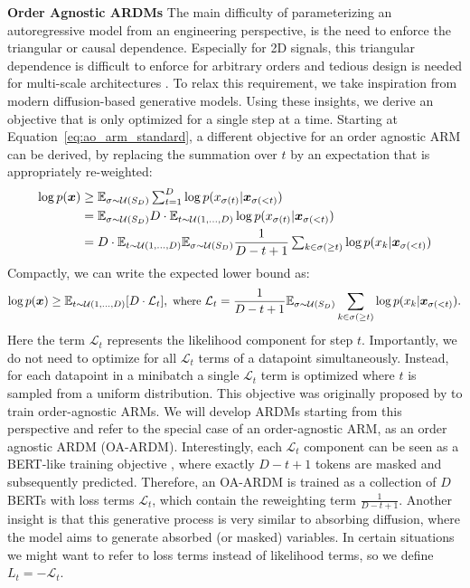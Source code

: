 \documentclass{article} \usepackage{iclr2022_conference,times}
\def\vx{{\bm{x}}}
\begin{document}
\textbf{Order Agnostic ARDMs} \hspace{.2cm} The main difficulty of parameterizing an autoregressive model from an engineering perspective, is the need to enforce the triangular or causal dependence. Especially for 2D signals, this triangular dependence is difficult to enforce for arbitrary orders \citep{jain2020locallymasked} and tedious design is needed for multi-scale architectures \citep{salimans2017pixelcnnpp}. To relax this requirement, we take inspiration from modern diffusion-based generative models. Using these insights, we derive an objective that is only optimized for a single step at a time. Starting at Equation~\ref{eq:ao_arm_standard}, a different objective for an order agnostic ARM can be derived, by replacing the summation over $t$ by an expectation that is appropriately re-weighted:
\begin{align*}
\small
\log p(\vx) &\geq \mathbb{E}_{\sigma \sim \mathcal{U}(S_D)} \textstyle\sum_{t=1}^{D} \log p(x_{\sigma(t)} | \vx_{\sigma(<t)}) \\ 
    &= \mathbb{E}_{\sigma \sim \mathcal{U}(S_D)} D \cdot \mathbb{E}_{t \sim \mathcal{U}(1, \ldots, D)}  \log p(x_{\sigma(t)} | \vx_{\sigma(<t)}) \\
     &= D \cdot \mathbb{E}_{t \sim \mathcal{U}(1, \ldots, D)} \mathbb{E}_{\sigma \sim \mathcal{U}(S_D)} \frac{1}{D - t + 1} \textstyle\sum_{k \in \sigma(\geq t)} \log p(x_{k} | \vx_{\sigma(<t)})
\end{align*}
Compactly, we can write the expected lower bound as:
\begin{equation*}
\small
\log p(\vx) \geq \mathbb{E}_{t \sim \mathcal{U}(1, \ldots, D)}[D \cdot \mathcal{L}_t], \text{ where } \mathcal{L}_t = \frac{1}{D - t + 1} \mathbb{E}_{\sigma \sim \mathcal{U}(S_D)} \sum_{k \in \sigma(\geq t)} \log p(x_{k} | \vx_{\sigma(<t)}).
\end{equation*}
Here the term $\mathcal{L}_t$ represents the likelihood component for step $t$. Importantly, we do not need to optimize for all $\mathcal{L}_t$ terms of a datapoint simultaneously. Instead, for each datapoint in a minibatch a single $\mathcal{L}_t$ term is optimized where $t$ is sampled from a uniform distribution. This objective was originally proposed by \citet{uria2014adeeptractable} to train order-agnostic ARMs. We will develop ARDMs starting from this perspective and refer to the special case of an order-agnostic ARM, as an order agnostic ARDM (OA-ARDM). Interestingly, each $\mathcal{L}_t$ component can be seen as a BERT-like training objective \citep{devlin2019bert}, where exactly $D-t+1$ tokens are masked and subsequently predicted. Therefore, an OA-ARDM is trained as a collection of $D$ BERTs with loss terms $\mathcal{L}_t$, which contain the reweighting term $\frac{1}{D - t + 1}$. Another insight is that this generative process is very similar to absorbing diffusion, where the model aims to generate absorbed (or masked) variables. In certain situations we might want to refer to loss terms instead of likelihood terms, so we define $L_t = - \mathcal{L}_t$. 
\end{document}
